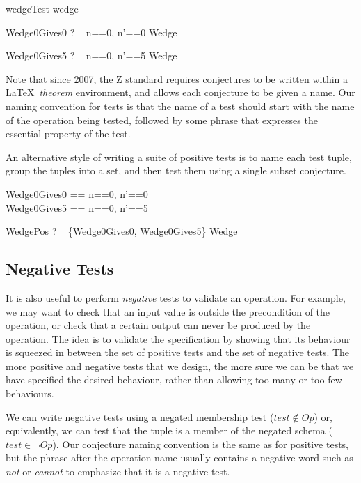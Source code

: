 \documentclass{llncs}
\begin{document}
\begin{zsection}
  \SECTION wedgeTest \parents wedge
\end{zsection}

\begin{theorem}{Wedge0Gives0}
  \vdash? ~ \lblot n==0, n'==0 \rblot \in Wedge
\end{theorem}
\vspace{-5ex}
\begin{theorem}{Wedge0Gives5}
  \vdash? ~ \lblot n==0, n'==5 \rblot \in Wedge
\end{theorem}

Note that since 2007, the Z standard requires conjectures
to be written within a \LaTeX\ \emph{theorem} environment, and allows
each conjecture to be given a name.  Our naming convention for tests
is that the name of a test should start with the name of the operation
being tested, followed by some phrase that expresses the essential
property of the test.

An alternative style of writing a suite of positive tests is to
name each test tuple, group the tuples into a set, and then test
them using a single subset conjecture.

\begin{zed}
  Wedge0Gives0 == \lblot n==0, n'==0 \rblot \\
  Wedge0Gives5 == \lblot n==0, n'==5 \rblot
\end{zed}

\begin{theorem}{WedgePos}
  \vdash? ~ \{Wedge0Gives0, Wedge0Gives5\} \subseteq Wedge
\end{theorem}


\subsection{Negative Tests}

It is also useful to perform \emph{negative} tests to validate an
operation.  For example, we may want to check that an input value is
outside the precondition of the operation, or check that a certain output
can never be produced by the operation.  The idea is to validate the
specification by showing that its behaviour is squeezed in between the set
of positive tests and the set of negative tests.  The more positive and
negative tests that we design, the more sure we can be that we have
specified the desired behaviour, rather than allowing too many or too few
behaviours.

We can write negative tests using a negated membership test ($test
\notin Op$) or, equivalently, we can test that the tuple is a member
of the negated schema ($test \in \lnot Op$).  Our conjecture naming
convention is the same as for positive tests, but the phrase after the
operation name usually contains a negative word such as \emph{not} or
\emph{cannot} to emphasize that it is a negative test.
\end{document}
